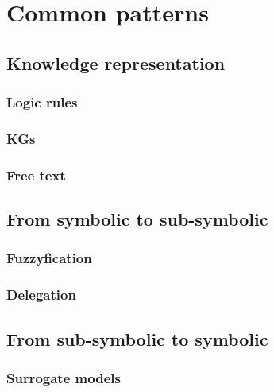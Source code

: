 \documentclass[12pt,a4paper,openright,twoside]{book}
\begin{document}

\chapter{Common patterns}\label{ch:common-patterns}

\section{Knowledge representation}\label{sec:knowledge-representation}

\subsection{Logic rules}\label{subsec:logic-rules}

\subsection{\Aclp{KG}}\label{subsec:kg}

\subsection{Free text}\label{subsec:free-text}

\section{From symbolic to sub-symbolic}\label{sec:from-symbolic-to-sub-symbolic}

\subsection{Fuzzyfication}\label{subsec:fuzzyfication}

\subsection{Delegation}\label{subsec:delegation}

\section{From sub-symbolic to symbolic}\label{sec:from-sub-symbolic-to-symbolic}

\subsection{Surrogate models}\label{subsec:surrogate-models}
\end{document}
